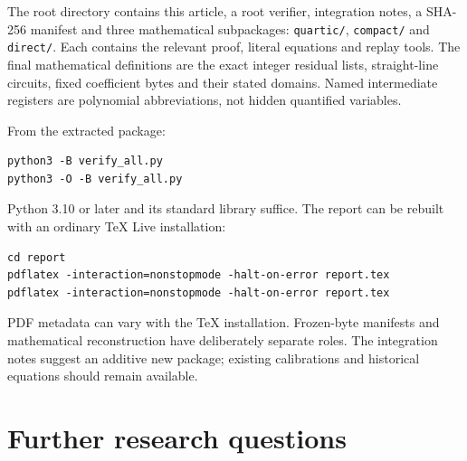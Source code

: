 \documentclass[11pt]{article}
\begin{document}
The root directory contains this article, a root verifier, integration
notes, a SHA-256 manifest and three mathematical subpackages:
\texttt{quartic/}, \texttt{compact/} and \texttt{direct/}.
Each contains the relevant proof, literal equations and replay tools.
The final mathematical definitions are the exact integer residual lists,
straight-line circuits, fixed coefficient bytes and their stated domains.
Named intermediate registers are polynomial abbreviations, not hidden
quantified variables.

From the extracted package:
\begin{verbatim}
python3 -B verify_all.py
python3 -O -B verify_all.py
\end{verbatim}
Python 3.10 or later and its standard library suffice. The report can be
rebuilt with an ordinary TeX Live installation:
\begin{verbatim}
cd report
pdflatex -interaction=nonstopmode -halt-on-error report.tex
pdflatex -interaction=nonstopmode -halt-on-error report.tex
\end{verbatim}
PDF metadata can vary with the TeX installation. Frozen-byte manifests
and mathematical reconstruction have deliberately separate roles.
The integration notes suggest an additive new package; existing
calibrations and historical equations should remain available.

\section{Further research questions}
\label{sec:further}
\end{document}
